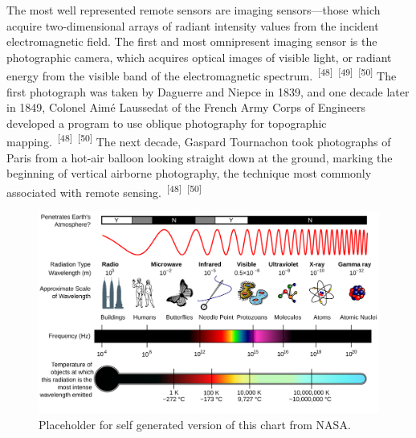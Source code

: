\documentclass{article}
\begin{document}
\par{The most well represented remote sensors are imaging sensors---those which acquire two-dimensional arrays of radiant intensity values from the incident electromagnetic field. The first and most omnipresent imaging sensor is the photographic camera, which acquires optical images of visible light, or radiant energy from the visible band of the electromagnetic spectrum.~\textsuperscript{[48]}~\textsuperscript{[49]}~\textsuperscript{[50]} The first photograph was taken by Daguerre and Niepce in 1839, and one decade later in 1849, Colonel Aimé Laussedat of the French Army Corps of Engineers developed a program to use oblique photography for topographic mapping.~\textsuperscript{[48]}~\textsuperscript{[50]}  The next decade, Gaspard Tournachon took photographs of Paris from a hot-air balloon looking straight down at the ground, marking the beginning of vertical airborne photography, the technique most commonly associated with remote sensing.~\textsuperscript{[48]}~\textsuperscript{[50]}}

\begin{figure}
    \centering
    \includegraphics[width=1\linewidth]{images/em-spectrum.png}
    \caption{Placeholder for self generated version of this chart from NASA.}
    \label{figure12}
\end{figure}
\end{document}

